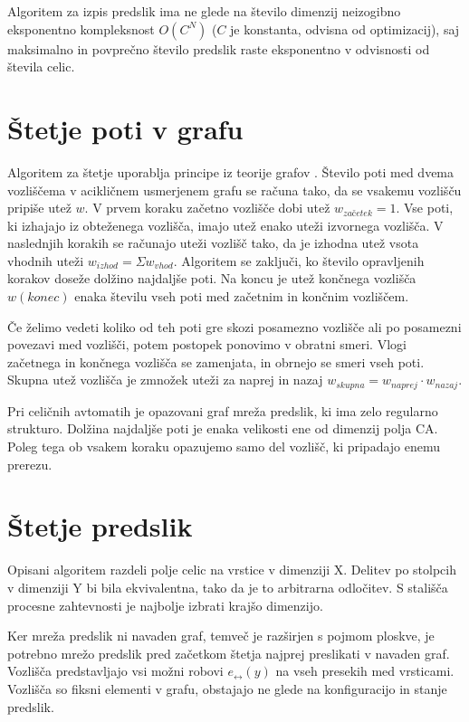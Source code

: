 \documentclass[12pt,a4paper,openany,twoside]{book}
\begin{document}
Algoritem za izpis predslik ima ne glede na število dimenzij
neizogibno eksponentno kompleksnost \(O(C^N)\) (\(C\) je konstanta, odvisna od optimizacij),
saj maksimalno in povprečno število predslik raste eksponentno
v odvisnosti od števila celic.

\section{Štetje poti v grafu}

Algoritem za štetje uporablja principe iz teorije grafov \cite{DBLP:journals/corr/cs-DL-0309023}.
Število poti med dvema vozliščema v acikličnem usmerjenem grafu se računa tako,
da se vsakemu vozlišču pripiše utež \(w\).
V prvem koraku začetno vozlišče dobi utež \(w_{začetek}=1\).
Vse poti, ki izhajajo iz obteženega vozlišča,
imajo utež enako uteži izvornega vozlišča.
V naslednjih korakih se računajo uteži vozlišč tako,
da je izhodna utež vsota vhodnih uteži \(w_{izhod}=\Sigma w_{vhod}\).
Algoritem se zaključi, ko število opravljenih korakov doseže dolžino najdaljše poti.
Na koncu je utež končnega vozlišča \(w(konec)\)
enaka številu vseh poti med začetnim in končnim vozliščem.

Če želimo vedeti koliko od teh poti gre skozi posamezno vozlišče
ali po posamezni povezavi med vozlišči,
potem postopek ponovimo v obratni smeri.
Vlogi začetnega in končnega vozlišča se zamenjata,
in obrnejo se smeri vseh poti.
Skupna utež vozlišča je zmnožek uteži za naprej in nazaj
\(w_{skupna} = w_{naprej} \cdot w_{nazaj}\).

Pri celičnih avtomatih je opazovani graf mreža predslik, ki ima zelo regularno strukturo.
Dolžina najdaljše poti je enaka velikosti ene od dimenzij polja CA.
Poleg tega ob vsakem koraku opazujemo samo del vozlišč, ki pripadajo enemu prerezu.

\section{Štetje predslik}

Opisani algoritem razdeli polje celic na vrstice v dimenziji X.
Delitev po stolpcih v dimenziji Y bi bila ekvivalentna, tako da je to arbitrarna odločitev.
S stališča procesne zahtevnosti je najbolje izbrati krajšo dimenzijo.

Ker mreža predslik ni navaden graf, temveč je razširjen s pojmom ploskve,
je potrebno mrežo predslik pred začetkom štetja najprej preslikati v navaden graf.
Vozlišča predstavljajo vsi možni robovi \(e_{\leftrightarrow}(y)\) na vseh presekih med vrsticami.
Vozlišča so fiksni elementi v grafu, obstajajo ne glede na konfiguracijo in stanje predslik.
\end{document}
